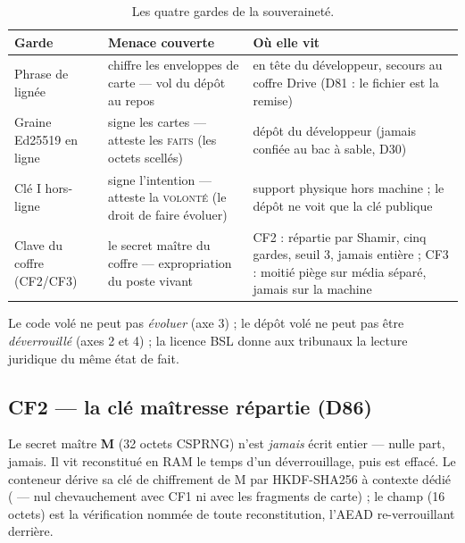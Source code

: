 \begin{table}[htbp]
\centering\small
\caption{Les quatre gardes de la souveraineté.}
\label{tab:gardehi}
\begin{tabularx}{\textwidth}{@{}l Y Y@{}}
\toprule
\textbf{Garde} & \textbf{Menace couverte} & \textbf{Où elle vit} \\
\midrule
Phrase de lignée & chiffre les enveloppes de carte — vol du dépôt au repos & en tête
du développeur, secours au coffre Drive (D81 : le fichier 
est la remise) \\
Graine Ed25519 en ligne & signe les cartes — atteste les \textsc{faits} (les octets
scellés) & dépôt du développeur (jamais confiée au bac à sable, D30) \\
Clé I hors-ligne & signe l'intention — atteste la \textsc{volonté} (le droit de faire
évoluer) & support physique hors machine ; le dépôt ne voit que la clé publique \\
Clave du coffre (CF2/CF3) & le secret maître du coffre — expropriation du poste vivant &
CF2 : répartie par Shamir, cinq gardes, seuil 3, jamais entière ; CF3 : moitié piège sur
média séparé, jamais sur la machine \\
\bottomrule
\end{tabularx}
\end{table}

Le code volé ne peut pas \emph{évoluer} (axe 3) ; le dépôt volé ne peut pas être
\emph{déverrouillé} (axes 2 et 4) ; la licence BSL donne aux tribunaux la lecture
juridique du même état de fait.

\subsection{CF2 — la clé maîtresse répartie (D86)}\label{sec:cf2}

Le secret maître \textbf{M} (32 octets CSPRNG) n'est \emph{jamais} écrit entier —
nulle part, jamais. Il vit reconstitué en RAM le temps d'un déverrouillage, puis est
effacé. Le conteneur  dérive sa clé de chiffrement de M par
HKDF-SHA256 à contexte dédié ( — nul chevauchement avec CF1 ni avec les
fragments de carte) ; le champ  (16 octets) est la vérification nommée de
toute reconstitution, l'AEAD re-verrouillant derrière.


